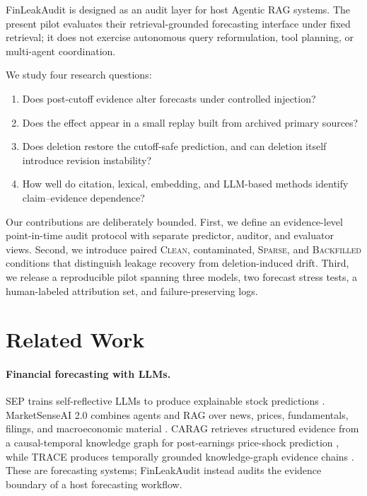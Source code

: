 \documentclass[10pt,twocolumn]{article}
\newcommand{\system}{FinLeakAudit}
\newcommand{\clean}{\textsc{Clean}}
\newcommand{\sparse}{\textsc{Sparse}}
\newcommand{\backfill}{\textsc{Backfilled}}
\begin{document}
\system{} is designed as an audit layer for host Agentic RAG systems. The present
pilot evaluates their retrieval-grounded forecasting interface under fixed retrieval;
it does not exercise autonomous query reformulation, tool planning, or multi-agent
coordination.

We study four research questions:
\begin{enumerate}
  \item Does post-cutoff evidence alter forecasts under controlled injection?
  \item Does the effect appear in a small replay built from archived primary sources?
  \item Does deletion restore the cutoff-safe prediction, and can deletion itself
        introduce revision instability?
  \item How well do citation, lexical, embedding, and LLM-based methods identify
        claim--evidence dependence?
\end{enumerate}

Our contributions are deliberately bounded. First, we define an evidence-level
point-in-time audit protocol with separate predictor, auditor, and evaluator views.
Second, we introduce paired \clean{}, contaminated, \sparse{}, and \backfill{}
conditions that distinguish leakage recovery from deletion-induced drift. Third, we
release a reproducible pilot spanning three models, two forecast stress tests, a
human-labeled attribution set, and failure-preserving logs.

\section{Related Work}

\paragraph{Financial forecasting with LLMs.}
SEP trains self-reflective LLMs to produce explainable stock predictions
\cite{koa2024sep}. MarketSenseAI 2.0 combines agents and RAG over news, prices,
fundamentals, filings, and macroeconomic material \cite{fatouros2025marketsenseai}.
CARAG retrieves structured evidence from a causal-temporal knowledge graph for
post-earnings price-shock prediction \cite{li2026carag}, while TRACE produces
temporally grounded knowledge-graph evidence chains \cite{ding2026trace}. These are
forecasting systems; \system{} instead audits the evidence boundary of a host
forecasting workflow.
\end{document}
